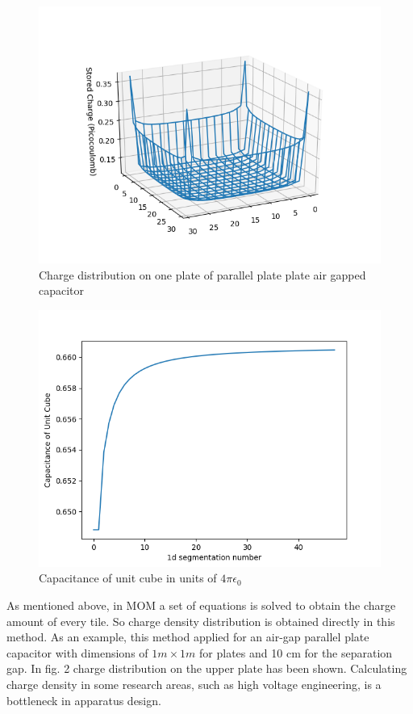 \documentclass[final,5p,times,twocolumn]{elsarticle}
\begin{document}
\begin {figure}[]
	\center
	\includegraphics[width=\linewidth]	{chargedistributionwireframe.png}
	\caption{Charge distribution on one plate of parallel plate plate air gapped capacitor}
\end{figure}
\begin {figure}[]
	\center
	\includegraphics[width=\linewidth]	{unitcube.png}
	\caption{Capacitance of unit cube in units of $4\pi \epsilon_0$}
\end{figure}
As mentioned above, in MOM a set of equations is solved to obtain the charge amount of every tile. So charge density distribution is obtained directly in this method. As an example, this method applied for an air-gap parallel plate capacitor with dimensions of $1m \times 1m $ for plates and 10 cm for the separation gap. In fig. 2 charge distribution on the upper plate has been shown. Calculating charge density in some research areas, such as high voltage engineering, is a bottleneck in apparatus design.
\end{document}
